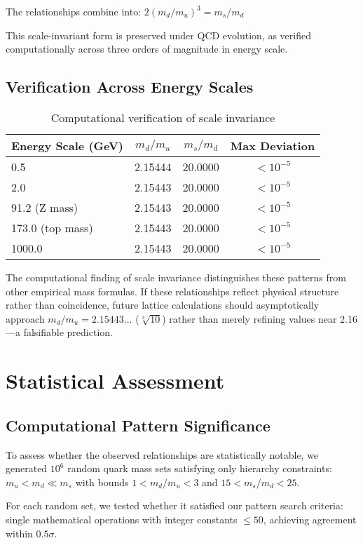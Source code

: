 \documentclass[12pt]{article}
\begin{document}
The relationships combine into: $2(m_d/m_u)^3 = m_s/m_d$

This scale-invariant form is preserved under QCD evolution, as verified computationally across three orders of magnitude in energy scale.

\subsection{Verification Across Energy Scales}

\begin{table}[h!]
\centering
\caption{Computational verification of scale invariance}
\begin{tabular}{lccc}
\toprule
Energy Scale (GeV) & $m_d/m_u$ & $m_s/m_d$ & Max Deviation \\
\midrule
0.5 & 2.15444 & 20.0000 & $<10^{-5}$ \\
2.0 & 2.15443 & 20.0000 & $<10^{-5}$ \\
91.2 (Z mass) & 2.15443 & 20.0000 & $<10^{-5}$ \\
173.0 (top mass) & 2.15443 & 20.0000 & $<10^{-5}$ \\
1000.0 & 2.15443 & 20.0000 & $<10^{-5}$ \\
\bottomrule
\end{tabular}
\end{table}

The computational finding of scale invariance distinguishes these patterns from other empirical mass formulas. If these relationships reflect physical structure rather than coincidence, future lattice calculations should asymptotically approach $m_d/m_u = 2.15443...$ ($\sqrt[3]{10}$) rather than merely refining values near 2.16—a falsifiable prediction.

\section{Statistical Assessment}

\subsection{Computational Pattern Significance}

To assess whether the observed relationships are statistically notable, we generated $10^6$ random quark mass sets satisfying only hierarchy constraints: $m_u < m_d \ll m_s$ with bounds $1 < m_d/m_u < 3$ and $15 < m_s/m_d < 25$.

For each random set, we tested whether it satisfied our pattern search criteria: single mathematical operations with integer constants $\leq 50$, achieving agreement within $0.5\sigma$.
\end{document}
